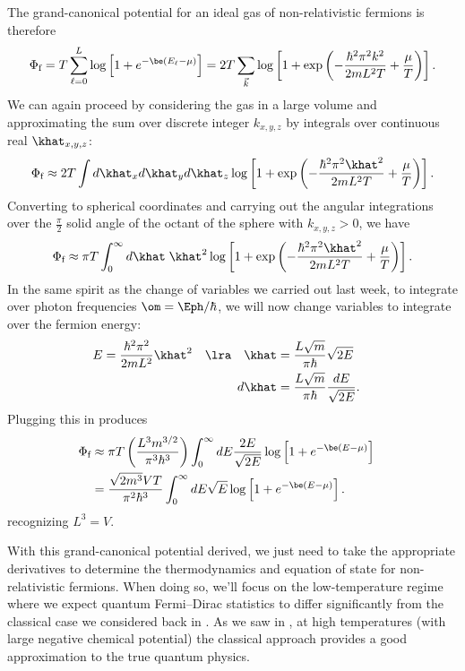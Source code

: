 The grand-canonical potential for an ideal gas of non-relativistic fermions is therefore
\begin{equation*}
  \Phi_{\text{f}} = T \sum_{\ell = 0}^L \log\left[1 + e^{-\be (E_{\ell} - \mu)}\right] = 2T \sum_{\vec k} \log\left[1 + \exp\left(-\frac{\hbar^2 \pi^2 k^2}{2mL^2 T} + \frac{\mu}{T}\right)\right].
\end{equation*}
We can again proceed by considering the gas in a large volume and approximating the sum over discrete integer $k_{x, y, z}$ by integrals over continuous real $\khat_{x, y, z}$:
\begin{equation*}
  \Phi_{\text{f}} \approx 2T \int d\khat_x d\khat_y d\khat_z \log\left[1 + \exp\left(-\frac{\hbar^2 \pi^2 \khat^2}{2mL^2 T} + \frac{\mu}{T}\right)\right].
\end{equation*}
Converting to spherical coordinates and carrying out the angular integrations over the $\frac{\pi}{2}$ solid angle of the octant of the sphere with $k_{x, y, z} > 0$, we have
\begin{equation*}
  \Phi_{\text{f}} \approx \pi T \int_0^{\infty} d\khat \; \khat^2 \log\left[1 + \exp\left(-\frac{\hbar^2 \pi^2 \khat^2}{2mL^2 T} + \frac{\mu}{T}\right)\right].
\end{equation*}
In the same spirit as the change of variables we carried out last week, to integrate over photon frequencies $\om = \Eph / \hbar$, we will now change variables to integrate over the fermion energy:
\begin{align*}
  E = \frac{\hbar^2 \pi^2}{2mL^2}\khat^2 \quad \lra \quad \khat & = \frac{L\sqrt{m}}{\pi \hbar} \sqrt{2E} \cr
                                                         d\khat & = \frac{L\sqrt{m}}{\pi \hbar} \frac{dE}{\sqrt{2E}}.
\end{align*}
Plugging this in produces
\begin{align}
  \Phi_{\text{f}} & \approx \pi T \left(\frac{L^3 m^{3 / 2}}{\pi^3 \hbar^3}\right) \int_0^{\infty} dE \frac{2E}{\sqrt{2E}} \log\left[1 + e^{-\be(E - \mu)}\right] \cr
                  & = \frac{\sqrt{2 m^3} VT}{\pi^2 \hbar^3} \int_0^{\infty} dE \sqrt{E} \log\left[1 + e^{-\be(E - \mu)}\right]. \label{eq:fermi_grand}
\end{align}
recognizing $L^3 = V$.

With this grand-canonical potential derived, we just need to take the appropriate derivatives to determine the thermodynamics and equation of state for non-relativistic fermions.
When doing so, we'll focus on the low-temperature regime where we expect quantum Fermi--Dirac statistics to differ significantly from the classical case we considered back in .
As we saw in , at high temperatures (with large negative chemical potential) the classical approach provides a good approximation to the true quantum physics.



